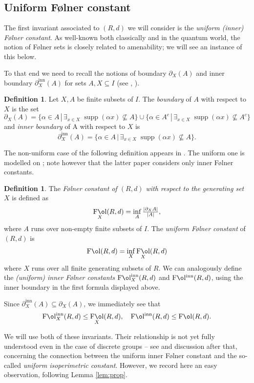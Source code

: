 \documentclass[11 pt, leqno]{amsart}
\DeclareMathOperator{\Fol}{F\mathrm{\o}l}
\DeclareMathOperator{\Folinn}{F\mathrm{\o}l^{inn}}
\newcommand{\FolinnX}{\operatorname{F\mathrm{\o}l}_{X}^{\operatorname{inn}}}
\DeclareMathOperator{\supp}{supp}
\DeclareMathOperator{\inn}{inn}
\theoremstyle{definition}
\newtheorem{definition}[theorem]{Definition}
\numberwithin{equation}{section}
\begin{document}
\subsection{Uniform F\o lner constant}
The first invariant associated to $(R,d)$ we will consider is the \emph{uniform (inner) F\o lner constant}. As well-known both classically and in the quantum world, the notion of F\o lner sets is closely related to amenability; we will see an instance of this below.


To that end we need to recall the notions of boundary $\partial_X (A)$ and inner boundary $\partial^{\inn}_X (A)$ for sets $A,X \subseteq I$ (see \cite{Kyed}, \cite{KyedThom}).

\begin{definition} \cite[Definition 3.2]{Kyed}	
Let $X,A$ be finite subsets of $I$. The \emph{boundary} of $A$ with respect to $X$ is the set
	\[
	\partial_X (A)=\{ \alpha\in A\,|\, \exists_{x\in X}\; \supp(\alpha x) \nsubseteq A\}\cup
	\{ \alpha\in A^c\,|\, \exists_{x\in X}\; \supp(\alpha x) \nsubseteq A^c\}
	\]
	and \emph{inner boundary} of A with respect to $X$ is
	\[
	\partial_X^{\inn}(A)=\{\alpha\in A\,|\, \exists_{x\in X}\;
	\supp(\alpha x)\nsubseteq A\}.
	\]	
\end{definition}

The non-uniform case of the following definition appears in \cite{Kyed}. The uniform one is modelled on \cite{Arzhantseva}; note however that the latter paper considers only inner F\o lner constants. 

\begin{definition}
The \emph{F\o lner constant of $(R,d)$ with respect to the generating set $X$} is defined as
	\[
	\Fol_X(R,d)=\inf_A \tfrac{ |\partial_X A|}{|A|},
	\]
	where $A$ runs over non-empty finite subsets of $I$. The \emph{uniform F\o lner constant} of $(R,d)$ is
	\[
	\Fol(R,d)=\inf_X \Fol_X(R,d)
	\]
	where $X$ runs over all finite generating subsets of $R$. %
	We can analogously define the \emph{(uniform) inner F\o lner constants}  $\FolinnX(R,d)$  and $\Folinn(R,d)$, using the inner boundary in the first formula displayed above.
\end{definition}

Since $\partial^{\inn}_X(A)\subseteq \partial_X(A)$, we immediately see that
\[
\FolinnX(R,d)\le \Fol_X(R,d),\quad
\Folinn(R,d)\le \Fol(R,d).
\]

We will use both of these invariants. Their relationship is not yet fully understood even in the case of discrete groups -- see  \cite[Proposition A.1]{LPV} and discussion after that, concerning the connection between the uniform inner F\o lner constant and the so-called \emph{uniform isoperimetric constant}. However, we record here an easy observation, following Lemma \ref{lem:prop}.
\end{document}
